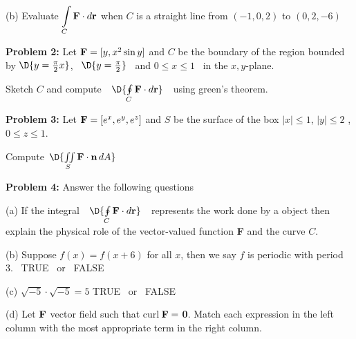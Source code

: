 \documentclass[12pt]{amsart}
\numberwithin{equation}{section}
\begin{document}
\vspace{0.4cm}

(b) Evaluate $\displaystyle{\int \limits_{C} \text{\bf F} \cdot  d\text{\bf r}}$ when $C$ is a straight line from $(-1,0,2)$ to $(0,2,-6)$

\thispagestyle{empty}
\newpage
\thispagestyle{empty}

{\bf Problem 2:} Let $\text{\bf F} = [y,x^2\sin y]$ and $C$ be the boundary of the region bounded by $\D{y=\frac{\pi}{2}x}$, \, $\D{y=\frac{\pi}{2}}$ \, and $0\le x \le 1$ \, in the $x,y$-plane.

Sketch $C$ and compute \,\, $\D{\oint \limits_{C} \text{\bf F}\cdot d\text{\bf r}}$ \,\, using green's theorem.\\

\vspace{19.2cm}

\thispagestyle{empty}
\newpage
\thispagestyle{empty}

{\bf Problem 3:} Let $\text{\bf F} = [e^x,e^y,e^z]$ and $S$ be the surface of the box $|x|\le 1$, $|y|\le 2$ , $0\le z \le 1$.

\vspace{0.2cm}

Compute \,$\D{\iint \limits_{S} \text{\bf F}\cdot \text{\bf n} \, dA}$

\vspace{0.2cm}

\thispagestyle{empty}
\newpage
\thispagestyle{empty}

{\bf Problem 4:} Answer the following questions

\vspace{0.1cm}

(a) If the integral \,\, $\D{\oint \limits_{C} \text{\bf F}\cdot d\text{\bf r}}$ \,\, represents the work done by a object then explain the physical role of the vector-valued function {\bf F} and the curve $C$.

\vspace{5.0cm}

(b) \quad Suppose $f(x) = f(x+6)$ for all $x$, then we say $f$ is periodic with period 3.  \, TRUE \, or \, FALSE

\vspace{2.0cm}

(c) \quad $\sqrt{-5}\cdot\sqrt{-5} = 5$  \quad TRUE \, or \, FALSE

\vspace{2.0cm}

(d) Let $\text{\bf F}$ vector field such that curl\,$\text{\bf F} =$ {\bf 0}.  Match each expression in the left column with the most appropriate term in the right column.
\end{document}
